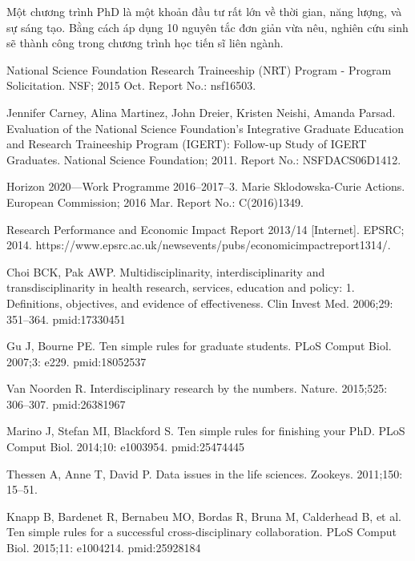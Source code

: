 \documentclass[12pt]{report}
\begin{document}
Một chương trình PhD là một khoản đầu tư rất lớn về thời gian, năng lượng, và sự sáng tạo. Bằng cách áp dụng 10 nguyên tắc đơn giản vừa nêu, nghiên cứu sinh sẽ thành công trong chương trình học tiến sĩ liên ngành.

\begin{thebibliography}{00}

 National Science Foundation Research Traineeship (NRT) Program - Program Solicitation. NSF; 2015 Oct. Report No.: nsf16503.

 Jennifer Carney, Alina Martinez, John Dreier, Kristen Neishi, Amanda Parsad. Evaluation of the National Science Foundation’s Integrative Graduate Education and Research Traineeship Program (IGERT): Follow-up Study of IGERT Graduates. National Science Foundation; 2011. Report No.: NSFDACS06D1412.

 Horizon 2020—Work Programme 2016–2017–3. Marie Sklodowska-Curie Actions. European Commission; 2016 Mar. Report No.: C(2016)1349.

 Research Performance and Economic Impact Report 2013/14 [Internet]. EPSRC; 2014. https://www.epsrc.ac.uk/newsevents/pubs/economicimpactreport1314/.

 Choi BCK, Pak AWP. Multidisciplinarity, interdisciplinarity and transdisciplinarity in health research, services, education and policy: 1. Definitions, objectives, and evidence of effectiveness. Clin Invest Med. 2006;29: 351–364. pmid:17330451

 Gu J, Bourne PE. Ten simple rules for graduate students. PLoS Comput Biol. 2007;3: e229. pmid:18052537

 Van Noorden R. Interdisciplinary research by the numbers. Nature. 2015;525: 306–307. pmid:26381967

 Marino J, Stefan MI, Blackford S. Ten simple rules for finishing your PhD. PLoS Comput Biol. 2014;10: e1003954. pmid:25474445

 Thessen A, Anne T, David P. Data issues in the life sciences. Zookeys. 2011;150: 15–51.

 Knapp B, Bardenet R, Bernabeu MO, Bordas R, Bruna M, Calderhead B, et al. Ten simple rules for a successful cross-disciplinary collaboration. PLoS Comput Biol. 2015;11: e1004214. pmid:25928184
	
\end{thebibliography}


\pagebreak
\end{document}
